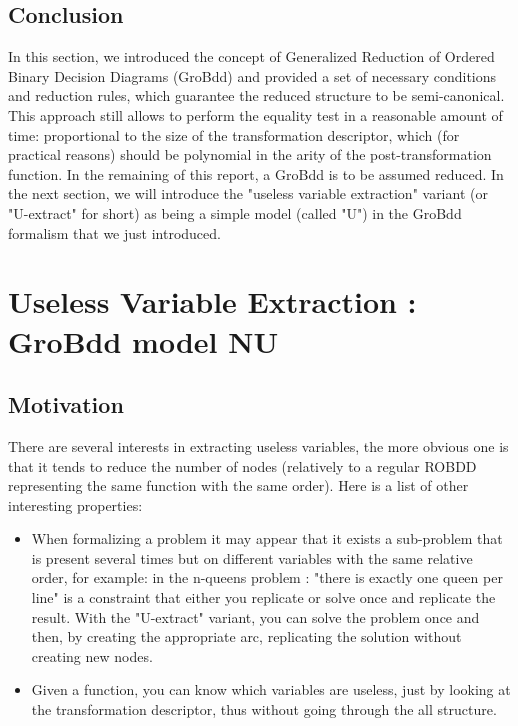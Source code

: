 \documentclass[a4paper,10pt]{article}
\begin{document}
\subsection{Conclusion}

In this section, we introduced the concept of Generalized Reduction of Ordered Binary Decision Diagrams (GroBdd) and provided a set of necessary conditions and reduction rules, which guarantee the reduced structure to be semi-canonical. This approach still allows to perform the equality test in a reasonable amount of time: proportional to the size of the transformation descriptor, which (for practical reasons) should be polynomial in the arity of the post-transformation function.
In the remaining of this report, a GroBdd is to be assumed reduced.
In the next section, we will introduce the "useless variable extraction" variant (or "U-extract" for short) as being a simple model (called "U") in the GroBdd formalism that we just introduced.

\section{Useless Variable Extraction : GroBdd model NU}

\subsection{Motivation}

There are several interests in extracting useless variables, the more obvious one is that it tends to reduce the number of nodes (relatively to a regular ROBDD representing the same function with the same order).
Here is a list of other interesting properties:\begin{itemize}
\item When formalizing a problem it may appear that it exists a sub-problem that is present several times but on different variables with the same relative order, for example: in the n-queens problem : "there is exactly one queen per line" is a constraint that either you replicate or solve once and replicate the result.
With the "U-extract" variant, you can solve the problem once and then, by creating the appropriate arc, replicating the solution without creating new nodes.
\item Given a function, you can know which variables are useless, just by looking at the transformation descriptor, thus without going through the all structure.
\end{itemize}
\end{document}
